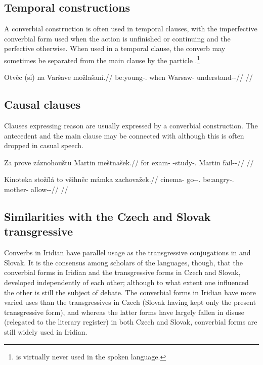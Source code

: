 \subsection{Temporal constructions}

A converbial construction is often used in temporal clauses, with the imperfective converbial form used when the action is
unfinished or continuing and the perfective otherwise. When used in a temporal
clause, the converb may sometimes be separated from the main clause by the
particle .\footnote{ is virtually never used in the spoken
language.}

\pex
\begingl
\gla Otvěc (si) na Varšave možlašaní.//
\glb be:young-\Cv{}.\Ipf{} when \Loc{} Warsaw-\Acc{} understand-\Av{}-\Ret{}//
\glft {}//
\endgl
\xe

\subsection{Causal clauses}

Clauses expressing reason are usually expressed by a converbial construction.
The antecedent and the main clause may be connected with 
although this is often dropped in casual speech.

\pex
\begingl
\gla Za prove záznohouštu Martin meštnašek.//
\glb for exam-\Acc{} \Neg{}-study-\Cv{}.\Pf{} Martin fail-\Av{}-\Pf{}//
\glft {}//
\endgl
\xe


\pex
\begingl
\gla Kinoteka stožílá to všihněc mámka zachovažek.//
\glb cinema-\Acc{} go-\Av{}-\Sbj{}.\Ipf{} \Rz{} be:angry-\Cv{}.\Ipf{} mother-\Dim{} allow-\Av{}-\Pf{}//
\glft {}//
\endgl
\xe


\subsection{Similarities with the Czech and Slovak transgressive}

Converbs in Iridian have parallel usage as the
transgressive conjugations in 
and Slovak. It is the consensus among scholars of the languages,
though, that the converbial forms in Iridian and the transgressive forms in
Czech and Slovak, developed independently of each other; although to what extent
one influenced the other is still the subject of debate. The converbial forms in
Iridian have more varied uses than the transgressives in Czech (Slovak having
kept only the present transgressive form), and whereas the latter forms have
largely fallen in disuse (relegated to the literary register) in both Czech and
Slovak, converbial forms are still widely used in Iridian.

